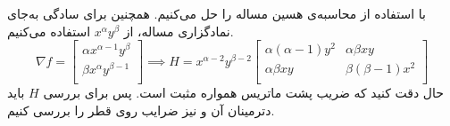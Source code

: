 با استفاده از محاسبه‌ی هسین مساله را حل می‌کنیم. همچنین برای سادگی به‌جای نمادگزاری مساله، از
$x^\alpha y^\beta$
استفاده می‌کنیم.
\[
\nabla f = \begin{bmatrix}
	\alpha x^{\alpha - 1}y^{\beta}\\
	\beta x^{\alpha}y^{\beta - 1}\\
\end{bmatrix}
\implies
H = x^{\alpha - 2}y^{\beta - 2}\begin{bmatrix}
\alpha (\alpha - 1)y^2 & \alpha \beta xy\\
 \alpha \beta xy & \beta (\beta - 1)x^2\\
\end{bmatrix}
\]
حال دقت کنید که ضریب پشت ماتریس همواره مثبت است. پس برای بررسی $H$ باید دترمینان آن و نیز ضرایب روی قطر را بررسی کنیم. \\
